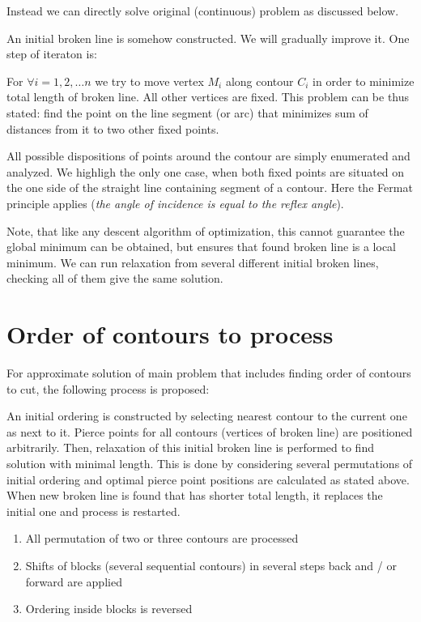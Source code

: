 \documentclass{../download/tPRS2e}
\begin{document}
Instead we can directly solve original
(continuous) problem as discussed below.

An initial broken line is somehow constructed.
We will gradually improve it.
One step of iteraton is:

For $ \forall i = 1, 2, \dots n$ we try to move vertex $M_i$
along contour $C_i$ in order to minimize total length
of broken line. All other vertices are fixed.
This problem can be thus stated:
find the point on the line segment (or arc)
that minimizes sum of distances from it to
two other fixed points.

All possible dispositions of points around the contour
are simply enumerated and analyzed.
We highligh the only one case,
when both fixed points are situated on the one side
of the straight line containing segment of a contour.
Here the Fermat principle applies
(\textit{the angle of incidence is equal to the reflex angle}).

Note, that like any descent algorithm of optimization,
this cannot guarantee
the global minimum can be obtained,
but ensures that found broken line is a local minimum.
We can run relaxation from several different initial broken lines,
checking all of them give the same solution.

\section{Order of contours to process}

For approximate solution of main problem
that includes finding order of contours to cut,
the following process is proposed:

An initial ordering is constructed by selecting 
nearest contour to the current one as next to it.
Pierce points for all contours 
(vertices of broken line) are positioned arbitrarily.
Then, relaxation of this initial broken line 
is performed to find solution with minimal length.
This is done by considering several permutations
of initial ordering and optimal pierce point positions
are calculated as stated above.
When new broken line is found
that has shorter total length,
it replaces the initial one and process is restarted.

\begin{enumerate}
    \item{All permutation of two or three contours are processed}
    \item{Shifts of blocks (several sequential contours) in several steps back and / or forward are applied}
    \item{Ordering inside blocks is reversed}
\end{enumerate}
\end{document}
